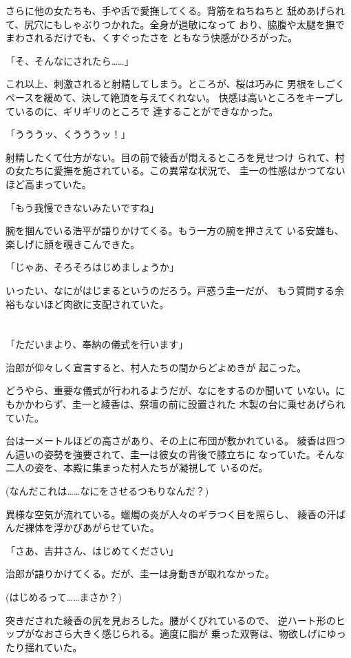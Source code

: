 ﻿\documentclass[
    book,tate,
    line_length=30zw,
    jafontsize=12pt,
    paper=b5j,
    landscape,
    ]{jlreq}
\begin{document}
さらに他の女たちも、手や舌で愛撫してくる。背筋をねちねちと
舐めあげられて、尻穴にもしゃぶりつかれた。全身が過敏になって
おり、脇腹や太腿を撫でまわされるだけでも、くすぐったさを
ともなう快感がひろがった。

「そ、そんなにされたら……」

これ以上、刺激されると射精してしまう。ところが、桜は巧みに
男根をしごくペースを緩めて、決して絶頂を与えてくれない。
快感は高いところをキープしているのに、ギリギリのところで
達することができなかった。

「うううッ、くうううッ！」

射精したくて仕方がない。目の前で綾香が悶えるところを見せつけ
られて、村の女たちに愛撫を施されている。この異常な状況で、
圭一の性感はかつてないほど高まっていた。

「もう我慢できないみたいですね」

腕を掴んでいる浩平が語りかけてくる。もう一方の腕を押さえて
いる安雄も、楽しげに顔を覗きこんできた。

「じゃあ、そろそろはじめましょうか」

いったい、なにがはじまるというのだろう。戸惑う圭一だが、
もう質問する余裕もないほど肉欲に支配されていた。

\section*{}

「ただいまより、奉納の儀式を行います」

治郎が仰々しく宣言すると、村人たちの間からどよめきが
起こった。

どうやら、重要な儀式が行われるようだが、なにをするのか聞いて
いない。にもかかわらず、圭一と綾香は、祭壇の前に設置された
木製の台に乗せあげられていた。

台は一メートルほどの高さがあり、その上に布団が敷かれている。
綾香は四つん這いの姿勢を強要されて、圭一は彼女の背後で膝立ちに
なっていた。そんな二人の姿を、本殿に集まった村人たちが凝視して
いるのだ。

(なんだこれは……なにをさせるつもりなんだ？)

異様な空気が流れている。蠟燭の炎が人々のギラつく目を照らし、
綾香の汗ばんだ裸体を浮かびあがらせていた。

「さあ、吉井さん、はじめてください」

治郎が語りかけてくる。だが、圭一は身動きが取れなかった。

(はじめるって……まさか？)

突きだされた綾香の尻を見おろした。腰がくびれているので、
逆ハート形のヒップがなおさら大きく感じられる。適度に脂が
乗った双臀は、物欲しげにゆったり揺れていた。
\end{document}
